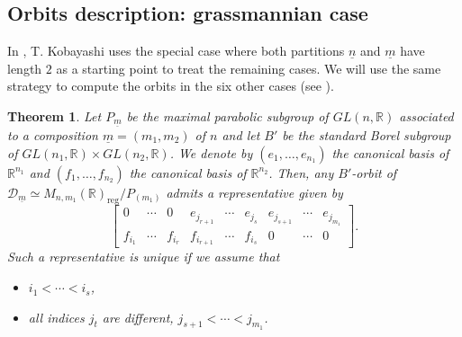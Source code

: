 \documentclass[pdftex]{sigma}
\numberwithin{equation}{section}
\theoremstyle{definition}
\newcommand{\R}{\mathbb{R}}
\theoremstyle{plain}
\theoremstyle{plain}
\theoremstyle{plain}
\theoremstyle{plain}
\newtheorem{thmxx}{Theorem}
\begin{document}
\subsection{Orbits description: grassmannian case}


In \cite{ActionVisible}, T. Kobayashi uses the special case where both partitions $\underline n$ and $\underline m$ have length $2$ as a starting point to treat the remaining cases.
We will use the same strategy to compute the orbits in the six other cases (see ).

\setcounter{thmxx}{1}
\begin{thmxx}\label{Theorem B'}
	Let $P_{\underline m}$ be the maximal parabolic subgroup of $GL(n,\R)$ associated to a composition $\underline m = (m_1,m_2)$ of $n$ and let $B'$ be the standard Borel subgroup of $GL(n_1,\R) \times GL(n_2,\R)$. We denote by $(e_1,\dots,e_{n_1})$ the canonical basis of $\R^{n_1}$ and $(f_1,\dots,f_{n_2})$ the canonical basis of $\R^{n_2}$. Then, any $B'$-orbit of $\mathcal D_{\underline{m}} \simeq M_{n,m_1}(\R)_{\mathrm{reg}}/P_{(m_1)}$ admits a representative given by
	\begin{equation*}
		\begin{bmatrix}
		0 & \cdots & 0  & e_{j_{r+1}} & \cdots & e_{j_{s}} & e_{j_{s+1}} & \cdots & e_{j_{m_1}} \\
		f_{i_1} & \cdots & f_{i_{r}}  & f_{i_{r+1}} & \cdots & f_{i_{s}} & 0 & \cdots & 0
	\end{bmatrix}.
	\end{equation*}
	Such a representative is unique if we assume that
	\begin{itemize}[leftmargin=*, label = --]
		\item $i_1 < \cdots < i_{s}$,
		\item all indices $j_t$ are different, $j_{s+1} < \cdots < j_{m_1}$.
	\end{itemize}
\end{thmxx}
\end{document}
